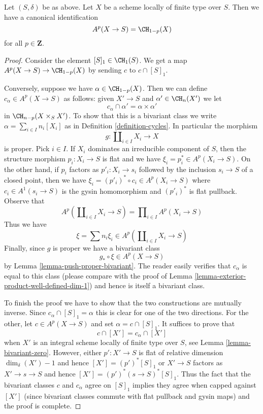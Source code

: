 \begin{lemma}
\label{lemma-chow-cohomology-towards-base-dim-1}
Let $(S, \delta)$ be as above. Let $X$ be a scheme locally of finite type
over $S$. Then we have a canonical identification
$$
A^p(X \to S) = \CH_{1 - p}(X)
$$
for all $p \in \mathbf{Z}$.
\end{lemma}

\begin{proof}
Consider the element $[S]_1 \in \CH_1(S)$. We get a map
$A^p(X \to S) \to \CH_{1 - p}(X)$ by sending $c$ to $c \cap [S]_1$.

\medskip\noindent
Conversely, suppose we have $\alpha \in \CH_{1 - p}(X)$.
Then we can define $c_\alpha \in A^p(X \to S)$ as
follows: given $X' \to S$ and $\alpha' \in \CH_n(X')$
we let
$$
c_\alpha \cap \alpha' = \alpha \times \alpha'
$$
in $\CH_{n - p}(X \times_S X')$. To show that this is a bivariant
class we write $\alpha = \sum_{i \in I} n_i[X_i]$ as in
Definition \ref{definition-cycles}. In particular the morphism
$$
g : \coprod\nolimits_{i \in I} X_i \longrightarrow X
$$
is proper. Pick $i \in I$. If $X_i$ dominates an irreducible component
of $S$, then the structure morphism $p_i : X_i \to S$ is flat and we have
$\xi_i = p_i^* \in A^p(X_i \to S)$. On the other hand, if $p_i$ factors
as $p'_i : X_i \to s_i$ followed by the inclusion $s_i \to S$
of a closed point, then we have
$\xi_i = (p'_i)^* \circ c_i \in A^p(X_i \to S)$
where $c_i \in A^1(s_i \to S)$ is the gysin homomorphism and
$(p'_i)^*$ is flat pullback. Observe that
$$
A^p(\coprod\nolimits_{i \in I} X_i \to S) =
\prod\nolimits_{i \in I} A^p(X_i \to S)
$$
Thus we have
$$
\xi = \sum n_i \xi_i \in A^p(\coprod\nolimits_{i \in I} X_i \to S)
$$
Finally, since $g$ is proper we have a bivariant class
$$
g_* \circ \xi \in A^p(X \to S)
$$
by Lemma \ref{lemma-push-proper-bivariant}. The reader easily
verifies that $c_\alpha$ is equal to this class
(please compare with the proof of
Lemma \ref{lemma-exterior-product-well-defined-dim-1})
and hence is itself a bivariant class.

\medskip\noindent
To finish the proof we have to show that the two constructions
are mutually inverse. Since $c_\alpha \cap [S]_1 = \alpha$
this is clear for one of the two directions. For the other, let
$c \in A^p(X \to S)$ and set $\alpha = c \cap [S]_1$.
It suffices to prove that
$$
c \cap [X'] = c_\alpha \cap [X']
$$
when $X'$ is an integral scheme locally of finite type over $S$,
see Lemma \ref{lemma-bivariant-zero}. However, either $p' : X' \to S$
is flat of relative dimension $\dim_\delta(X') - 1$ and hence
$[X'] = (p')^*[S]_1$ or $X' \to S$ factors as $X' \to s \to S$
and hence $[X'] = (p')^*(s \to S)^*[S]_1$. Thus the fact that the
bivariant classes $c$ and $c_\alpha$ agree on $[S]_1$
implies they agree when capped against $[X']$ (since bivariant classes
commute with flat pullback and gysin maps) and the proof is complete.
\end{proof}

